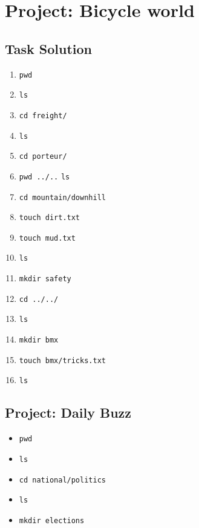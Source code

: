 \documentclass[12pt]{article}
\begin{document}
\section{Project: Bicycle world}
\subsection{Task Solution}
\begin{enumerate}[1.]
    \item \texttt{pwd}
    \item \texttt{ls}
    \item \texttt{cd freight/}
    \item \texttt{ls}
    \item \texttt{cd porteur/}
    \item \texttt{pwd ../..} \texttt{ls}
    \item \texttt{cd mountain/downhill}
    \item \texttt{touch dirt.txt}
    \item \texttt{touch mud.txt}
    \item \texttt{ls}
    \item \texttt{mkdir safety}
    \item \texttt{cd ../../}
    \item \texttt{ls}
    \item \texttt{mkdir bmx}
    \item \texttt{touch bmx/tricks.txt}
    \item \texttt{ls}
\end{enumerate}

\bigskip

\subsection{Project: Daily Buzz}
\begin{itemize}
    \item \texttt{pwd}
    \item \texttt{ls}
    \item \texttt{cd national/politics}
    \item \texttt{ls}
    \item \texttt{mkdir elections}
\end{itemize}
\end{document}
